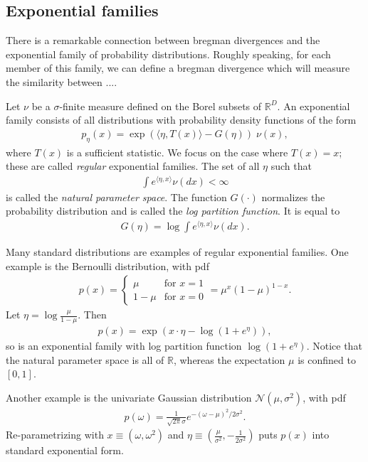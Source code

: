 \documentclass{article}
\newcommand{\R}{\mathbb{R}}
\newcommand{\N}{\mathcal{N}}
\begin{document}
\subsection{Exponential families}
There is a remarkable connection between bregman divergences and
the exponential family of probability distributions.  Roughly
speaking, for each member of this family, we can define a bregman
divergence which will measure the similarity between ....

Let $\nu$ be a $\sigma$-finite measure defined on the Borel subsets of
$\R^D$.  An  exponential family
consists of all distributions with probability density functions of the form
\begin{align*}
p_{\eta}(x) = \exp(\langle\eta,T(x) \rangle - G(\eta))\;\nu(x),
\end{align*}
where $T(x)$ is a sufficient statistic.  We focus on the case where
$T(x)=x$; these are called \emph{regular} exponential families.  
The set of all $\eta$ such that 
\begin{align*}
\int e^{\langle \eta,x \rangle} \nu(dx) < \infty
\end{align*}
is called the \emph{natural parameter space}.  The function $G(\cdot)$ normalizes
the probability distribution and is called the \emph{log partition
function}.  It is equal to
\begin{align*}
G(\eta) = \log \int e^{\langle \eta,x \rangle } \nu(dx).
\end{align*}

Many standard distributions are examples of regular exponential
families.  One example is the Bernoulli distribution, with
pdf 
\begin{align*}
p(x) = \left\{\begin{array}{cc} \mu & \mbox{for }x=1\\
1-\mu & \mbox{for } x=0
\end{array} \right. = \mu^x(1-\mu)^{1-x}.
\end{align*}
Let $\eta = \log\frac{\mu}{1-\mu}$.  Then 
\begin{align*}
p(x) = \exp(x\cdot\eta - \log(1+e^{\eta})),
\end{align*}
so is an exponential family with log partition function
$\log(1+e^{\eta})$.  Notice that the natural parameter space is all of
$\R$, whereas the expectation $\mu$ is confined to $[0,1]$.  

Another example is the univariate Gaussian distribution
$\N(\mu,\sigma^2)$, with pdf 
\begin{align*}
p(\omega) = \frac{1}{\sqrt{2\pi}\sigma}e^{-(\omega-\mu)^2/2\sigma^2}.
\end{align*} 
Re-parametrizing with $x\equiv (\omega,\omega^2)$ and $\eta \equiv
(\frac{\mu}{\sigma^2},-\frac{1}{2\sigma^2})$ puts $p(x)$ into standard
exponential form.  
\end{document}
